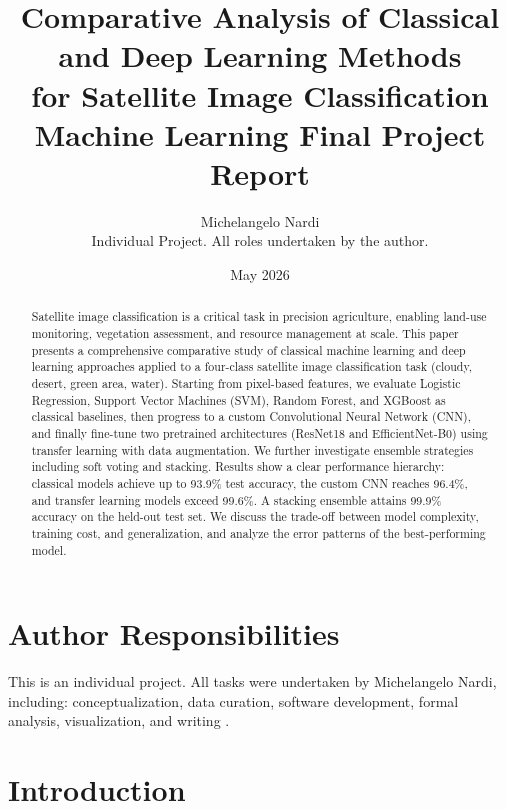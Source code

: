 \documentclass[12pt, a4paper]{article}
\title{\textbf{Comparative Analysis of Classical and Deep Learning Methods\\
for Satellite Image Classification}\\[0.5em]
\large Machine Learning Final Project Report}
\author{Michelangelo Nardi\\
\small Individual Project. All roles undertaken by the author.}
\date{May 2026}
\begin{document}
\maketitle

\section*{Author Responsibilities}

This is an individual project. All tasks were undertaken by Michelangelo Nardi, including: conceptualization, data curation, software development, formal analysis, visualization, and writing \cite{niso_credit}.

\begin{abstract}
Satellite image classification is a critical task in precision agriculture, enabling land-use monitoring, vegetation assessment, and resource management at scale. This paper presents a comprehensive comparative study of classical machine learning and deep learning approaches applied to a four-class satellite image classification task (cloudy, desert, green area, water). Starting from pixel-based features, we evaluate Logistic Regression, Support Vector Machines (SVM), Random Forest, and XGBoost as classical baselines, then progress to a custom Convolutional Neural Network (CNN), and finally fine-tune two pretrained architectures (ResNet18 and EfficientNet-B0) using transfer learning with data augmentation. We further investigate ensemble strategies including soft voting and stacking. Results show a clear performance hierarchy: classical models achieve up to 93.9\% test accuracy, the custom CNN reaches 96.4\%, and transfer learning models exceed 99.6\%. A stacking ensemble attains 99.9\% accuracy on the held-out test set. We discuss the trade-off between model complexity, training cost, and generalization, and analyze the error patterns of the best-performing model.
\end{abstract}

\section{Introduction}
\end{document}
